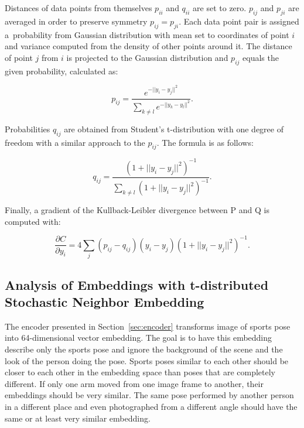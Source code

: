 Distances of data points from themselves $p_{i i}$ and $q_{i i}$ are set to zero. $p_{i j}$ and $p_{j i}$ are averaged in order to preserve symmetry $p_{i j} = p_{j i}$. Each data point pair is assigned a~probability from Gaussian distribution with mean set to coordinates of point $i$ and variance computed from the density of other points around it. The distance of point $j$ from $i$ is projected to the Gaussian distribution and $p_{i j}$ equals the given probability, calculated as:

\begin{equation}
    \label{eq:tsne-p}
    p_{i j} = \frac{e^{-|| {y}_{i} - {y}_{j} ||^2}}{\sum \limits_{k \neq l} e^{-|| {y}_{k} - {y}_{l} ||^2}}.
\end{equation}

\noindent Probabilities $q_{i j}$ are obtained from Student's t-distribution with one degree of freedom with a similar approach to the $p_{i j}$. The formula is as follows:

\begin{equation}
    \label{eq:tsne-q}
    q_{i j} = \frac{(1 + || {y}_{i} - {y}_{j} ||^2)^{-1}}{\sum \limits_{k \neq l} (1 + || {y}_{i} - {y}_{j} ||^2)^{-1}}.
\end{equation}

\noindent Finally, a gradient of the Kullback-Leibler divergence between P and Q is computed with:

\begin{equation}
    \label{eq:tsne-gradient}
    \frac{\partial C}{\partial y_{i}} = 4 \sum \limits_{j} (p_{i j} - q_{i j}) (y_{i} - y_{j}) (1 + || {y}_{i} - {y}_{j} ||^2)^{-1}.
\end{equation}

\newpage\subsection{Analysis of Embeddings with t-distributed Stochastic Neighbor Embedding}

The encoder presented in Section~\ref{sec:encoder} transforms image of sports pose into 64-dimensional vector embedding. The goal is to have this embedding describe only the sports pose and ignore the background of the scene and the look of the person doing the pose. Sports poses similar to each other should be closer to each other in the embedding space than poses that are completely different. If only one arm moved from one image frame to another, their embeddings should be very similar. The same pose performed by another person in a different place and even photographed from a different angle should have the same or at least very similar embedding.

